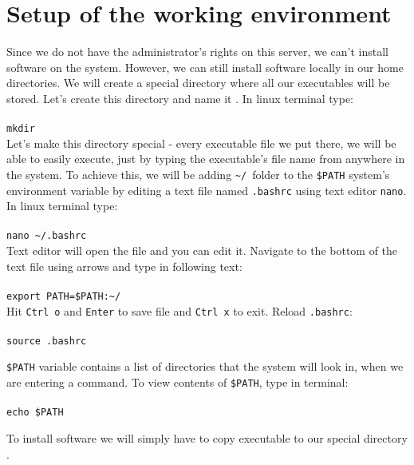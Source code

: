 \section{Setup of the working environment}
Since we do not have the administrator's rights on this server, we can't install
software on the system. However, we can still install software locally in our home
directories. We will create a special directory where all our executables will be stored.
Let's create this directory and name it \texttt{\binDir}. In linux terminal type:\\~\\
\texttt{mkdir \binDir}\\

Let's make this directory special - every executable file we put there, we will be able
to easily execute, just by typing the executable's file name from anywhere in the system.
To achieve this, we will be adding \texttt{\textasciitilde/\binDir}~folder to the \texttt{\$PATH} 
system's environment variable by editing a text file named \texttt{.bashrc} using text editor \texttt{nano}.
In linux terminal type:\\~\\
\texttt{nano \textasciitilde/.bashrc}\\

Text editor will open the file and you can edit it. Navigate to the bottom of the text file using arrows
and type in following text:\\~\\
\texttt{export PATH=\$PATH:\textasciitilde/\binDir}\\

Hit \texttt{Ctrl o} and \texttt{Enter} to save file and \texttt{Ctrl x} to exit.
Reload \texttt{.bashrc}:\\~\\
\texttt{source .bashrc}\\

\begin{framed}
\texttt{\$PATH} variable contains a list of directories that the system will look in, when we are
entering a command. To view contents of \texttt{\$PATH}, type in terminal:\\~\\
\texttt{echo \$PATH}\\
\end{framed}
To install software we will simply have to copy executable to our special directory \texttt{\binDir}.

